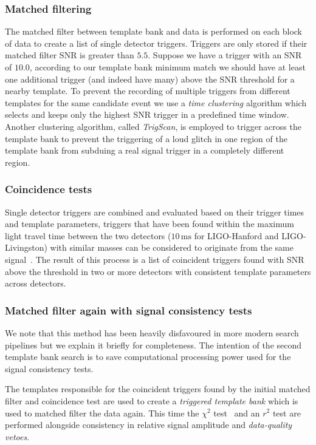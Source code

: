 \subsubsection{Matched filtering}

The matched filter between template bank and data is performed on each block of data to create a list of single detector triggers. Triggers are only stored if their matched filter SNR is greater than $5.5$. Suppose we have a trigger with an SNR of $10.0$, according to our template bank minimum match we should have at least one additional trigger (and indeed have many) above the SNR threshold for a nearby template. To prevent the recording of multiple triggers from different templates for the same candidate event we use a \textit{time clustering} algorithm which selects and keeps only the highest SNR trigger in a predefined time window. Another clustering algorithm, called \textit{TrigScan}, is employed to trigger across the template bank to prevent the triggering of a loud glitch in one region of the template bank from subduing a real signal trigger in a completely different region.

\subsubsection{Coincidence tests}

Single detector triggers are combined and evaluated based on their trigger times and template parameters, triggers that have been found within the maximum light travel time between the two detectors ($10 \, \text{ms}$ for LIGO-Hanford and LIGO-Livingston) with similar masses can be considered to originate from the same \gwadj signal~\cite{Robinson:2008}. The result of this process is a list of coincident triggers found with SNR above the threshold in two or more detectors with consistent template parameters across detectors.

\subsubsection{Matched filter again with signal consistency tests}

We note that this method has been heavily disfavoured in more modern search pipelines but we explain it briefly for completeness. The intention of the second template bank search is to save computational processing power used for the signal consistency tests.

The templates responsible for the coincident triggers found by the initial matched filter and coincidence test are used to create a \textit{triggered template bank} which is used to matched filter the data again. This time the $\chi^{2}$ test~\cite{Allen_Chi:2005} and an $r^{2}$ test are performed alongside consistency in relative signal amplitude and \textit{data-quality vetoes}.

